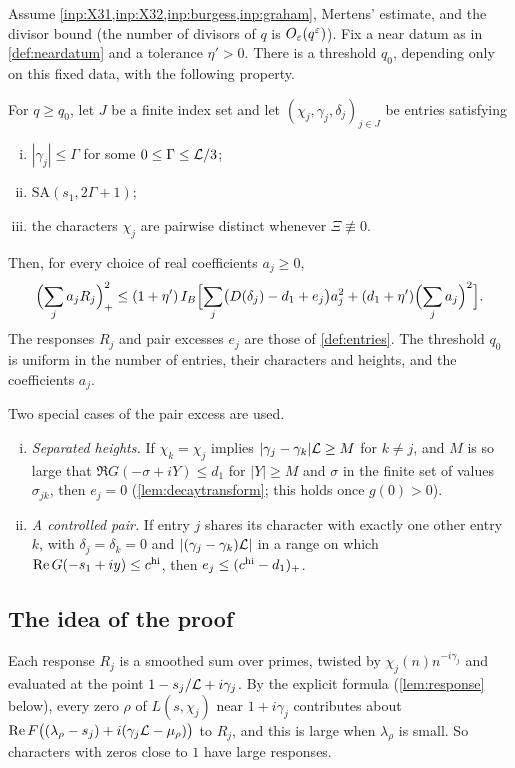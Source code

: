 \begin{theorem}\label{thm:graded}
Assume \cref{inp:X31,inp:X32,inp:burgess,inp:graham}, Mertens' estimate, and the divisor
bound (the number of divisors of $q$ is $O_\varepsilon(q^\varepsilon)$). Fix a near datum as in \cref{def:neardatum} and a
tolerance $\eta'>0$. There is a threshold $q_0$, depending only on this fixed data, with
the following property.

For $q\ge q_0$, let $J$ be a finite index set and let
$(\chi_j,\gamma_j,\delta_j)_{j\in J}$ be entries satisfying
\begin{enumerate}[(i)]
  \item $|\gamma_j|\le\Gamma$ for some $0\le\Gamma\le\mathcal{L}/3$;
  \item $\mathrm{SA}(s_1,2\Gamma+1)$;
  \item the characters $\chi_j$ are pairwise distinct whenever $\Xi\not\equiv0$.
\end{enumerate}
Then, for every choice of real coefficients $a_j\ge0$,
\[
  \Bigl(\sum_ja_jR_j\Bigr)_+^2\le(1+\eta')\,I_B\Bigl[\sum_j\bigl(D(\delta_j)-d_1+e_j\bigr)a_j^2
  +(d_1+\eta')\Bigl(\sum_ja_j\Bigr)^2\Bigr].
\]
The responses $R_j$ and pair excesses $e_j$ are those of \cref{def:entries}.
The threshold $q_0$ is uniform in the number of entries, their characters and heights,
and the coefficients $a_j$.
\end{theorem}

Two special cases of the pair excess are used.
\begin{enumerate}[(i)]
  \item \emph{Separated heights.} If $\chi_k=\chi_j$ implies $|\gamma_j-\gamma_k|\mathcal{L}\ge M$ for $k\ne j$,
    and $M$ is so large that $\Re G(-\sigma+iY)\le d_1$ for $|Y|\ge M$ and $\sigma$ in the finite set
    of values $\sigma_{jk}$, then $e_j=0$ (\cref{lem:decaytransform}; this holds once $g(0)>0$).
  \item \emph{A controlled pair.} If entry $j$ shares its character with exactly one other entry
    $k$, with $\delta_j=\delta_k=0$ and $|(\gamma_j-\gamma_k)\mathcal{L}|$ in a range on which
    $\operatorname{Re} G(-s_1+iy)\le c^{\mathrm{hi}}$, then $e_j\le(c^{\mathrm{hi}}-d_1)_+$.
\end{enumerate}

\subsection{The idea of the proof}\label{subsec:nearidea}
Each response $R_j$ is a smoothed sum over primes, twisted by $\chi_j(n)n^{-i\gamma_j}$ and
evaluated at the point $1-s_j/\mathcal{L}+i\gamma_j$. By the explicit formula (\cref{lem:response} below),
every zero $\rho$ of $L(s,\chi_j)$ near $1+i\gamma_j$ contributes about
$\operatorname{Re} F\bigl((\lambda_\rho-s_j)+i(\gamma_j\mathcal{L}-\mu_\rho)\bigr)$ to $R_j$, and this is large when $\lambda_\rho$ is small.
So characters with zeros close to $1$ have large responses.

